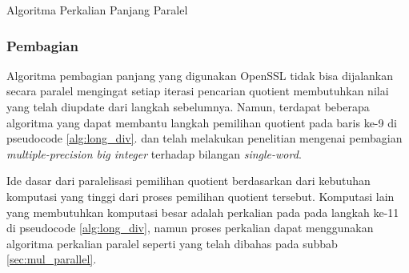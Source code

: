       \begin{algorithm}
        \caption{Algoritma Perkalian Panjang Paralel}
        \label{alg:mul_parallel}
        \begin{algorithmic}[1]
          \Statex
          \State {}
          \EndFor
          \EndFor
          \State {}
          \EndFunction
        \end{algorithmic}
      \end{algorithm}

    \subsubsection{Pembagian}\label{sec:div_parallel}
      Algoritma pembagian panjang yang digunakan OpenSSL tidak bisa dijalankan secara paralel mengingat setiap iterasi pencarian quotient membutuhkan nilai yang telah diupdate dari langkah sebelumnya. Namun, terdapat beberapa algoritma yang dapat membantu langkah pemilihan quotient pada baris ke-9 di pseudocode \ref{alg:long_div}. \citet{parallel_short_div_emmart} dan \citet{parallel_short_div_takahashi} telah melakukan penelitian mengenai pembagian \textit{multiple-precision big integer} terhadap bilangan \textit{single-word}.

      Ide dasar dari paralelisasi pemilihan quotient berdasarkan dari kebutuhan komputasi yang tinggi dari proses pemilihan quotient tersebut. Komputasi lain yang membutuhkan komputasi besar adalah perkalian pada pada langkah ke-11 di pseudocode \ref{alg:long_div}, namun proses perkalian dapat menggunakan algoritma perkalian paralel seperti yang telah dibahas pada subbab \ref{sec:mul_parallel}.

